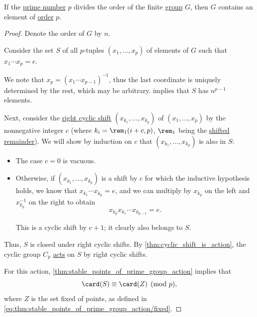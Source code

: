 \begin{theorem}\label{thm:cauchys_subgroup_theorem}
  If the \hyperref[def:prime_number]{prime number} \( p \) divides the order of the finite \hyperref[def:group]{group} \( G \), then \( G \) contains an element of \hyperref[def:group_element_order]{order} \( p \).
\end{theorem}
\begin{proof}
  Denote the order of \( G \) by \( n \).

  Consider the set \( S \) of all \( p \)-tuples \( (x_1, \ldots, x_p) \) of elements of \( G \) such that \( x_1 \cdots x_p = e \).

  We note that \( x_p = (x_1 \cdots x_{p-1})^{-1} \), thus the last coordinate is uniquely determined by the rest, which may be arbitrary.  implies that \( S \) has \( n^{p-1} \) elements.

  Next, consider the \hyperref[def:cyclic_shift]{right cyclic shift} \( (x_{k_1}, \ldots, x_{k_p}) \) of \( (x_1, \ldots, x_p) \) by the nonnegative integer \( c \) (where \( k_i = \rem_1(i + c, p) \), \( \rem_1 \) being the \hyperref[def:shifted_remainder]{shifted remainder}). We will show by induction on \( c \) that \( (x_{k_1}, \ldots, x_{k_p}) \) is also in \( S \):
  \begin{itemize}
    \item The case \( c = 0 \) is vacuous.
    \item Otherwise, if \( (x_{k_1}, \ldots, x_{k_p}) \) is a shift by \( c \) for which the inductive hypothesis holds, we know that \( x_{k_1} \cdots x_{k_p} = e \), and we can multiply by \( x_{k_p} \) on the left and \( x_{k_p}^{-1} \) on the right to obtain
    \begin{equation*}
      x_{k_p} x_{k_1} \cdots x_{k_{p-1}} = e.
    \end{equation*}

    This is a cyclic shift by \( c + 1 \); it clearly also belongs to \( S \).
  \end{itemize}

  Thus, \( S \) is closed under right cyclic shifts. By \cref{thm:cyclic_shift_is_action}, the cyclic group \( C_p \) \hyperref[def:group_action]{acts} on \( S \) by right cyclic shifts.

  For this action, \cref{thm:stable_points_of_prime_group_action} implies that
  \begin{equation*}
    \card(S) \equiv \card(Z) \pmod p,
  \end{equation*}
  where \( Z \) is the set fixed of points, as defined in \eqref{eq:thm:stable_points_of_prime_group_action/fixed}.


\end{proof}
